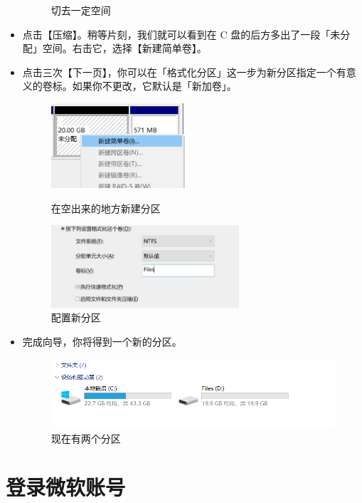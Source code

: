 \begin{itemize}
\begin{figure}[htb!]
\begin{minipage}{8.2cm}
      \caption{切去一定空间}
      \label{compress-size}
    \end{minipage}
  \end{figure}
  \item 点击【压缩】。稍等片刻，我们就可以看到在 C 盘的后方多出了一段「未分配」空间。右击它，选择【新建简单卷】。
  \item 点击三次【下一页】，你可以在「格式化分区」这一步为新分区指定一个有意义的卷标。如果你不更改，它默认是「新加卷」。
  \begin{figure}[htb!]
    \centering
    \begin{minipage}{6cm}
      \centering
      \includegraphics[width=5cm]{assets/New_Volume.jpg}
      \caption{在空出来的地方新建分区}
      \label{new-volume}
    \end{minipage}
    \begin{minipage}{7.2cm}
      \centering
      \includegraphics[width=7cm]{assets/New_Vol_Setup.jpg}
      \caption{配置新分区}
      \label{new-vol-setup}
    \end{minipage}
  \end{figure}
  \item 完成向导，你将得到一个新的分区。
    \begin{figure}[htb!]
      \centering
      \includegraphics[width=11cm]{assets/Two_Volumes.png}
      \caption{现在有两个分区}
      \label{two-volumes}
    \end{figure}
\end{itemize}
    
\section{登录微软账号}

